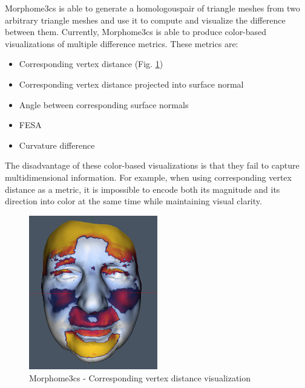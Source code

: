Morphome3cs is able to generate a homologous\footnotemark pair of triangle meshes from two arbitrary triangle meshes and use it to compute and visualize the difference between them. Currently, Morphome3cs is able to produce color-based visualizations of multiple difference metrics. These metrics are:


\begin{itemize}
\item Corresponding vertex distance (Fig. \ref{fig:morpho-example})
\item Corresponding vertex distance projected into surface normal
\item Angle between corresponding surface normals
\item FESA\footnotemark
\item Curvature difference
\end{itemize}


The disadvantage of these color-based visualizations is that they fail to capture multidimensional information. For example, when using corresponding vertex distance as a metric, it is impossible to encode both its magnitude and its direction into color at the same time while maintaining visual clarity.

\begin{figure}[h]
\centering
\includegraphics[width=0.5\textwidth]{./img/morpho-example01.PNG}
\caption[Morphome3cs - Corresponding vertex distance visualization]{Morphome3cs - Corresponding vertex distance visualization}
\label{fig:morpho-example}
\end{figure}

